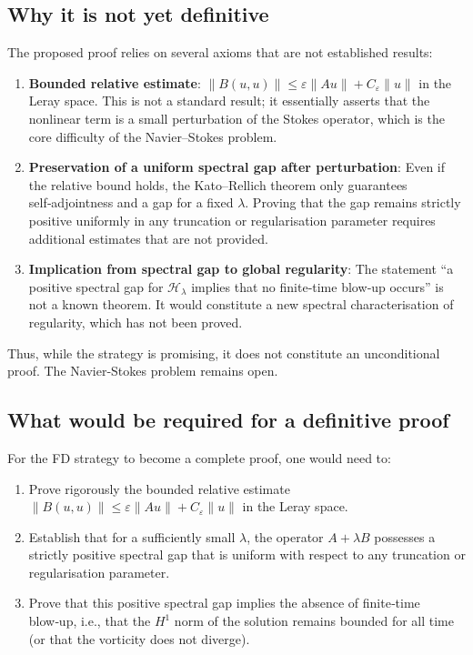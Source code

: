 \documentclass[11pt,a4paper]{article}
\begin{document}
\subsection{Why it is not yet definitive}
The proposed proof relies on several axioms that are not established results:

\begin{enumerate}
\item \textbf{Bounded relative estimate}: \(\|B(u,u)\| \le \varepsilon \|Au\| + C_\varepsilon \|u\|\) in the Leray space. This is not a standard result; it essentially asserts that the nonlinear term is a small perturbation of the Stokes operator, which is the core difficulty of the Navier–Stokes problem.
\item \textbf{Preservation of a uniform spectral gap after perturbation}: Even if the relative bound holds, the Kato–Rellich theorem only guarantees self‑adjointness and a gap for a fixed \(\lambda\). Proving that the gap remains strictly positive uniformly in any truncation or regularisation parameter requires additional estimates that are not provided.
\item \textbf{Implication from spectral gap to global regularity}: The statement “a positive spectral gap for \(\mathcal{H}_\lambda\) implies that no finite‑time blow‑up occurs” is not a known theorem. It would constitute a new spectral characterisation of regularity, which has not been proved.
\end{enumerate}

Thus, while the strategy is promising, it does not constitute an unconditional proof. The Navier‑Stokes problem remains open.

\subsection{What would be required for a definitive proof}
For the FD strategy to become a complete proof, one would need to:

\begin{enumerate}
\item Prove rigorously the bounded relative estimate \(\|B(u,u)\| \le \varepsilon \|Au\| + C_\varepsilon \|u\|\) in the Leray space.
\item Establish that for a sufficiently small \(\lambda\), the operator \(A + \lambda B\) possesses a strictly positive spectral gap that is uniform with respect to any truncation or regularisation parameter.
\item Prove that this positive spectral gap implies the absence of finite‑time blow‑up, i.e., that the \(H^1\) norm of the solution remains bounded for all time (or that the vorticity does not diverge).
\end{enumerate}
\end{document}
